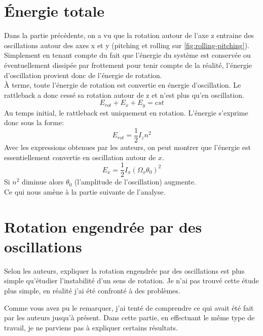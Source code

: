 \documentclass[12pt,a4paper]{article}
\begin{document}
	\section{Énergie totale}
	Dans la partie précédente, on a vu que la rotation autour de l'axe z entraine des oscillations autour des axes x et y (pitching et rolling sur \autoref{fig:rolling-pitching}).\\
	Simplement en tenant compte du fait que l'énergie du système est conservée ou éventuellement dissipée par frottement pour tenir compte de la réalité, l'énergie d'oscillation provient donc de l'énergie de rotation.\\
	À terme, toute l'énergie de rotation est convertie en énergie d'oscillation. Le rattleback a donc cessé sa rotation autour de z et n'est plus qu'en oscillation.
	\begin{equation}
	E_{rot}+E_{x}+E_{y}=cst
	\end{equation}
	Au temps initial, le rattleback est uniquement en rotation. L'énergie s'exprime donc sous la forme:
	\begin{equation}
		E_{rot}=\dfrac{1}{2}I_zn^2
	\end{equation}
	Avec les expressions obtenues par les auteurs, on peut montrer que l'énergie est essentiellement convertie en oscillation autour de $x$.
	\begin{equation}
		E_x=\dfrac{1}{2}I_x(\Omega_x\theta_0)^2
	\end{equation}
	Si $n^2$ diminue alors $\theta_0$ (l'amplitude de l'oscillation) augmente.\\
	Ce qui nous amène à la partie suivante de l'analyse.
	\section{Rotation engendrée par des oscillations}
	\label{sec:osc-to-rot}
	Selon les auteurs, expliquer la rotation engendrée par des oscillations est plus simple qu'étudier l'instabilité d'un sens de rotation. Je n'ai pas trouvé cette étude plus simple, en réalité j'ai été confronté à des problèmes.
	
	Comme vous avez pu le remarquer, j'ai tenté de comprendre ce qui avait été fait par les auteurs jusqu'à présent. Dans cette partie, en effectuant le même type de travail, je ne parviens pas à expliquer certains résultats.
	
\end{document}
